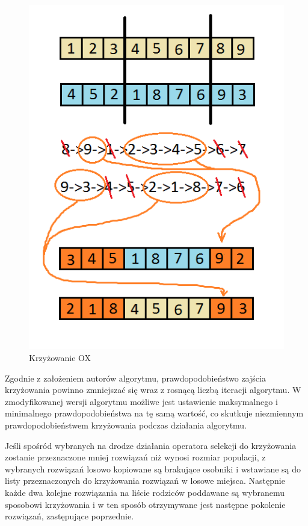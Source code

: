 \newpage
\begin{figure}[h]
\includegraphics[scale=1]{ox}
\caption{Krzyżowanie OX}
\end{figure}

Zgodnie z założeniem autorów algorytmu, prawdopodobieństwo zajścia krzyżowania powinno zmniejszać się wraz z rosnącą liczbą iteracji algorytmu. W zmodyfikowanej wersji algorytmu możliwe jest ustawienie maksymalnego i minimalnego prawdopodobieństwa na tę samą wartość, co skutkuje niezmiennym prawdopodobieństwem krzyżowania podczas działania algorytmu.

Jeśli spośród wybranych na drodze działania operatora selekcji do krzyżowania zostanie przeznaczone mniej rozwiązań niż wynosi rozmiar populacji, z wybranych rozwiązań losowo kopiowane są brakujące osobniki i wstawiane są do listy przeznaczonych do krzyżowania rozwiązań w losowe miejsca. Następnie każde dwa kolejne rozwiązania na liście rodziców poddawane są wybranemu sposobowi krzyżowania i w ten sposób otrzymywane jest następne pokolenie rozwiązań, zastępujące poprzednie.

